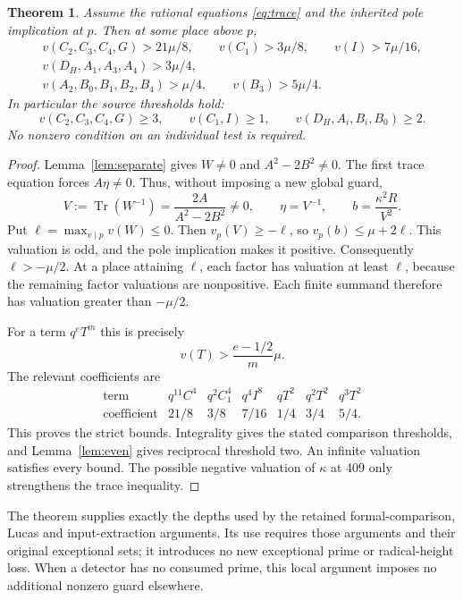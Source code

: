 \documentclass[11pt,a4paper]{article}
\newtheorem{theorem}{Theorem}[section]
\DeclareMathOperator{\Tr}{Tr}
\begin{document}
\begin{theorem}\label{thm:extract}
Assume the rational equations \eqref{eq:trace} and the inherited
pole implication at $p$. Then at some place above $p$,
\[
 \begin{gathered}
 v(C_2,C_3,C_4,G)>21\mu/8,\qquad
 v(C_1)>3\mu/8,\qquad v(I)>7\mu/16,\\
 v(D_H,A_1,A_3,A_4)>3\mu/4,\\
 v(A_2,B_0,B_1,B_2,B_4)>\mu/4,\qquad
 v(B_3)>5\mu/4.
 \end{gathered}
\]
In particular the source thresholds hold:
\[
 v(C_2,C_3,C_4,G)\ge3,\qquad v(C_1,I)\ge1,
 \qquad v(D_H,A_i,B_i,B_0)\ge2.
\]
No nonzero condition on an individual test is required.
\end{theorem}
\begin{proof}
Lemma~\ref{lem:separate} gives $W\ne0$ and
$A^2-2B^2\ne0$. The first trace equation forces $A\eta\ne0$.
Thus, without imposing a new global guard,
\[
 V:=\Tr(W^{-1})=\frac{2A}{A^2-2B^2}\ne0,\qquad
                   \eta=V^{-1},\qquad b=\frac{\kappa^2R}{V^2}.
\]
Put $\ell=\max_{v\mid p}v(W)\le0$. Then $v_p(V)\ge-\ell$,
so $v_p(b)\le\mu+2\ell$. This valuation is odd, and the pole
implication makes it positive. Consequently $\ell>-\mu/2$.
At a place attaining $\ell$, each factor has valuation at least
$\ell$, because the remaining factor valuations are nonpositive.
Each finite summand therefore has valuation greater than $-\mu/2$.

For a term $q^eT^m$ this is precisely
\[
                             v(T)>\frac{e-1/2}{m}\mu.
\]
The relevant coefficients are
\[
\begin{array}{c|cccccc}
\text{term}&q^{11}C^4&q^2C_1^4&q^4I^8&qT^2&q^2T^2&q^3T^2\\\hline
\text{coefficient}&21/8&3/8&7/16&1/4&3/4&5/4.
\end{array}
\]
This proves the strict bounds. Integrality gives the stated comparison
thresholds, and Lemma~\ref{lem:even} gives reciprocal threshold two.
An infinite valuation satisfies every bound. The possible negative
valuation of $\kappa$ at 409 only strengthens the trace inequality.
\end{proof}

The theorem supplies exactly the depths used by the retained
formal-comparison, Lucas and input-extraction arguments. Its use
requires those arguments and their original exceptional sets; it
introduces no new exceptional prime or radical-height loss.
When a detector has no consumed prime, this local argument imposes
no additional nonzero guard elsewhere.
\end{document}
